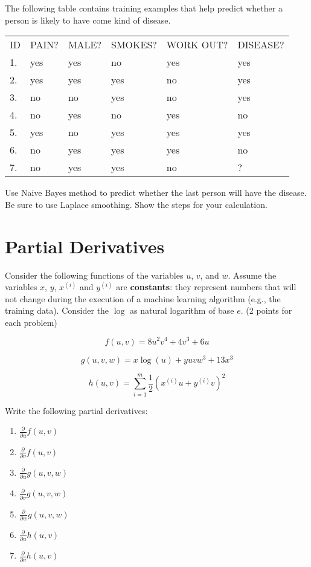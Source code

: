 \documentclass{article}
\begin{document}
The following table contains training examples that help predict whether a person is likely to have come kind of disease.

\begin{center}
\begin{tabular}{ l l l l l l } 
ID &	PAIN? &	MALE? &	SMOKES? &	WORK OUT? &	DISEASE?\\
1. &	yes &	yes &	no &	yes &	yes\\
2. &	yes &	yes &	yes &	no &	yes\\
3. &	no &	no &	yes &	no &	yes\\
4. &	no &	yes &	no &	yes &	no\\
5. &	yes &	no &	yes &	yes &	yes\\
6. &	no &	yes &	yes &	yes &	no\\
7. &	no &	yes &	yes &	no &	?\\
\end{tabular}
\end{center}

Use Naive Bayes method to predict whether the last person will have the disease. Be sure to use Laplace smoothing. Show the steps for your calculation.  


\section{Partial Derivatives}

Consider the following functions of the variables $u$, $v$, and $w$. Assume the variables $x$, $y$, $x^{(i)}$ and $y^{(i)}$ are {\bf constants}: they represent numbers that will not change during the execution of a machine learning algorithm (e.g., the training data). Consider the $\log $ as natural logarithm of base $e$.
(2 points for each problem)

$$f(u,v)=8u^2 v^4 +4v^3 +6u$$

$$g(u,v,w)=x\log(u) +yuvw^3+13x^3 $$

$$h(u,v)=\sum_{i=1}^m \frac{1}{2} (x^{(i)}u + y^{(i)}v)^2$$

{\noindent} Write the following partial derivatives:

\begin{enumerate}
    \item $\frac{\partial}{\partial u} f(u,v)$
    \item $\frac{\partial}{\partial v} f(u,v)$
    \item $\frac{\partial}{\partial u} g(u,v,w)$
     \item $\frac{\partial}{\partial v} g(u,v,w)$                 
     \item $\frac{\partial}{\partial w} g(u,v,w)$
    \item $\frac{\partial}{\partial u} h(u,v)$
    \item $\frac{\partial}{\partial v} h(u,v)$
     
\end{enumerate}
\end{document}
